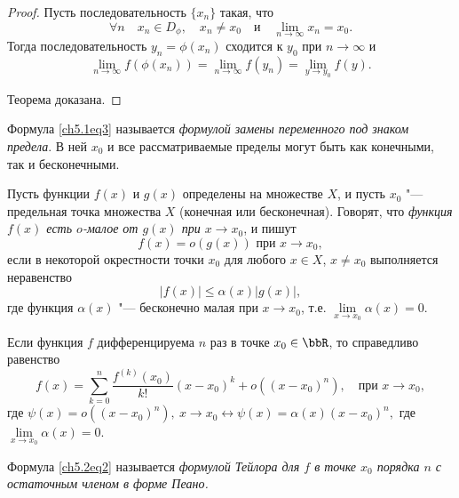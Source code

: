 \begin{proof}
Пусть последовательность $\{ x_n \}$ такая, что 
$$
\forall n \quad x_n \in D_{\phi}, \quad x_n \not= x_0 \quad \text{и} \quad \lim_{n \to \infty} x_n = x_0.
$$
Тогда последовательность $y_n = \phi(x_n)$ сходится к $y_0$ при $n \to \infty$ и 
$$
\lim_{n \to \infty} f(\phi(x_n)) = \lim_{n \to \infty} f(y_n) = \lim_{y \to y_0} f(y).
$$

Теорема доказана.
\end{proof}

Формула \eqref{ch5.1eq3} называется \textit{формулой замены переменного под знаком предела}. В ней $x_0$ и все рассматриваемые пределы могут быть как конечными, так и бесконечными.

\begin{defn}
Пусть функции $f(x)$ и $g(x)$ определены на множестве $X$, и пусть $x_0$ "--- предельная точка множества $X$ (конечная или бесконечная). Говорят, что \textit{функция $f(x)$ есть $o$-малое от $g(x)$ при $x\to x_0$}, и пишут
$$
f(x) = o(g(x)) \text{ при } x\to x_0,
$$ 
если в некоторой окрестности точки $x_0$ для любого $x \in X$, $x\ne x_0$ выполняется неравенство\footnotemark
$$
|f(x)| \le \alpha(x)|g(x)|,
$$
где функция $\alpha(x)$ "--- бесконечно малая при $x\to x_0$, т.е. $\lim\limits_{x\to x_0}\alpha(x)= 0$.
\end{defn}

\begin{thm}
Если функция $f$ дифференцируема $n$ раз в точке $x_0 \in \bbR$, то справедливо равенство
\begin{equation} \label{ch5.2eq2}
f(x) = \sum_{k = 0}^{n} \frac{f^{(k)}(x_0)}{k!} (x - x_0)^k + o((x - x_0)^n), \quad \text{при } x \to x_0,
\end{equation}
где $\psi(x) = o((x - x_0)^n),\ x \to x_0 \leftrightarrow \psi(x) = \alpha(x) (x - x_0)^n,$ где $\lim\limits_{x \to x_0} \alpha(x) = 0$.
\end{thm}

Формула \eqref{ch5.2eq2} называется \textit{формулой Тейлора для $f$ в точке $x_0$ порядка $n$ с остаточным членом в форме Пеано.}


